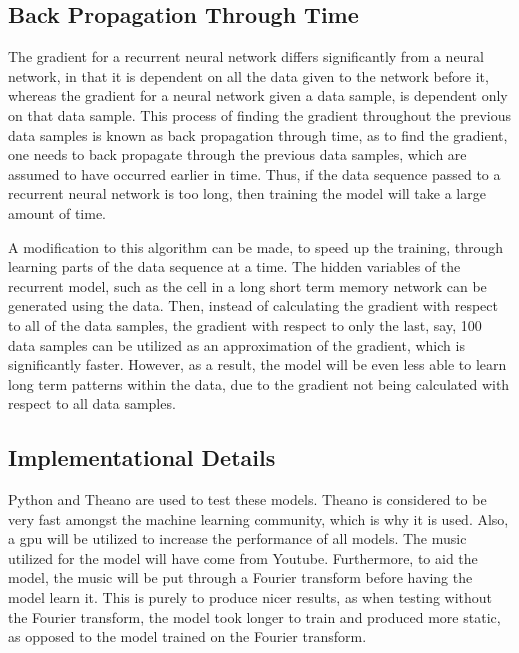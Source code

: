 \documentclass{article}
\begin{document}
\subsection{Back Propagation Through Time}
The gradient for a recurrent neural network differs significantly from a neural
network, in that it is dependent on all the data given to the network before it,
whereas the gradient for a neural network given a data sample, is dependent only
on that data sample. This process of finding the gradient throughout the
previous data samples is known as back propagation through time, as to find the
gradient, one needs to back propagate through the previous data samples, which
are assumed to have occurred earlier in time. Thus, if the data sequence passed
to a recurrent neural network is too long, then training the model will take a
large amount of time.

A modification to this algorithm can be made, to speed up the training, through
learning parts of the data sequence at a time. The hidden variables of the
recurrent model, such as the cell in a long short term memory network can be
generated using the data. Then, instead of calculating the gradient with respect
to all of the data samples, the gradient with respect to only the last, say, 100
data samples can be utilized as an approximation of the gradient, which is
significantly faster. However, as a result, the model will be even less able to
learn long term patterns within the data, due to the gradient not being
calculated with respect to all data samples.



\subsection{Implementational Details}
Python and Theano are used to test these models. Theano is considered to be very
fast amongst the machine learning community, which is why it is used. Also, a
gpu will be utilized to increase the performance of all models. The music
utilized for the model will have come from Youtube. Furthermore, to aid the
model, the music will be put through a Fourier transform before having the model
learn it. This is purely to produce nicer results, as when testing without the
Fourier transform, the model took longer to train and produced more static,
as opposed to the model trained on the Fourier transform.
\end{document}
